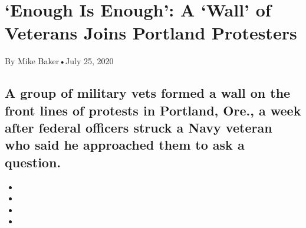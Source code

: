 \hypertarget{enough-is-enough-a-wall-of-veterans-joins-portland-protesters-1}{%
\section{`Enough Is Enough': A `Wall' of Veterans Joins Portland
Protesters}\label{enough-is-enough-a-wall-of-veterans-joins-portland-protesters-1}}

By Mike Baker•July 25, 2020

\hypertarget{a-group-of-military-vets-formed-a-wall-on-the-front-lines-of-protests-in-portland-ore-a-week-after-federal-officers-struck-a-navy-veteran-who-said-he-approached-them-to-ask-a-question-1}{%
\subsection{A group of military vets formed a wall on the front lines of
protests in Portland, Ore., a week after federal officers struck a Navy
veteran who said he approached them to ask a
question.}\label{a-group-of-military-vets-formed-a-wall-on-the-front-lines-of-protests-in-portland-ore-a-week-after-federal-officers-struck-a-navy-veteran-who-said-he-approached-them-to-ask-a-question-1}}

\begin{itemize}
\item
\item
\item
\item
\end{itemize}

